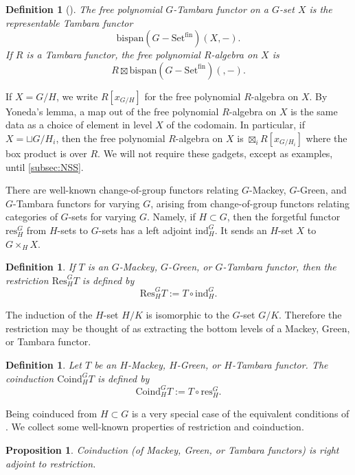 \documentclass[11pt,dvipsnames]{amsart}
\newtheorem{proposition}[theorem]{Proposition}
\theoremstyle{BoldRemark}
\newtheorem{definition}[theorem]{Definition}
\newcommand{\Set}{\mathrm{Set}}
\begin{document}
\begin{definition}[\cite{BH18}]\label{def:free-poly-algs}
	The free polynomial $G$-Tambara functor on a $G$-set $X$ is the representable Tambara functor \[ \mathrm{bispan}(G-\Set^{\mathrm{fin}})(X,-) . \] If $R$ is a Tambara functor, the free polynomial $R$-algebra on $X$ is \[ R \boxtimes \mathrm{bispan}(G-\Set^{\mathrm{fin}})(,-) . \]
\end{definition}

If $X = G/H$, we write $R[x_{G/H}]$ for the free polynomial $R$-algebra on $X$. By Yoneda's lemma, a map out of the free polynomial $R$-algebra on $X$ is the same data as a choice of element in level $X$ of the codomain. In particular, if $X = \sqcup G/H_i$, then the free polynomial $R$-algebra on $X$ is $\boxtimes_i R[x_{G/H_i}]$ where the box product is over $R$. We will not require these gadgets, except as examples, until \cref{subsec:NSS}.

There are well-known change-of-group functors relating $G$-Mackey, $G$-Green, and $G$-Tambara functors for varying $G$, arising from change-of-group functors relating categories of $G$-sets for varying $G$. Namely, if $H \subset G$, then the forgetful functor $\mathrm{res}_H^G$ from $H$-sets to $G$-sets has a left adjoint $\mathrm{ind}_H^G$. It sends an $H$-set $X$ to $G \times_H X$.

\begin{definition}
	If $T$ is an $G$-Mackey, $G$-Green, or $G$-Tambara functor, then the restriction $\mathrm{Res}_H^G T$ is defined by 
    \[ 
        \mathrm{Res}_H^G T := T \circ \mathrm{ind}_H^G .
    \]
\end{definition}

The induction of the $H$-set $H/K$ is isomorphic to the $G$-set $G/K$. Therefore the restriction may be thought of as extracting the bottom levels of a Mackey, Green, or Tambara functor.

\begin{definition}
	Let $T$ be an $H$-Mackey, $H$-Green, or $H$-Tambara functor. The coinduction $\mathrm{Coind}_H^G T$ is defined by \[ \mathrm{Coind}_H^G T := T \circ \mathrm{res}_H^G . \]
\end{definition}

Being coinduced from $H \subset G$ is a very special case of the equivalent conditions of \cite[Corollary 4.5]{Lew80}. We collect some well-known properties of restriction and coinduction.

\begin{proposition}
	Coinduction (of Mackey, Green, or Tambara functors) is right adjoint to restriction.
\end{proposition}
\end{document}
